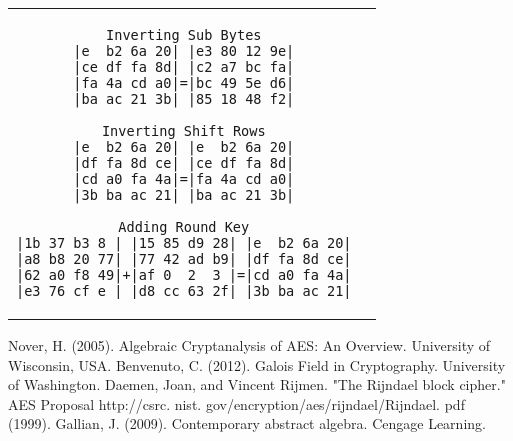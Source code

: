 \documentclass{article}
\begin{document}
\begin{tabular}{@{}c@{ }c@{}}
\begin{lstlisting}
Inverting Sub Bytes
|e  b2 6a 20| |e3 80 12 9e|
|ce df fa 8d| |c2 a7 bc fa|
|fa 4a cd a0|=|bc 49 5e d6|
|ba ac 21 3b| |85 18 48 f2|

Inverting Shift Rows
|e  b2 6a 20| |e  b2 6a 20|
|df fa 8d ce| |ce df fa 8d|
|cd a0 fa 4a|=|fa 4a cd a0|
|3b ba ac 21| |ba ac 21 3b|

Adding Round Key
|1b 37 b3 8 | |15 85 d9 28| |e  b2 6a 20|
|a8 b8 20 77| |77 42 ad b9| |df fa 8d ce|
|62 a0 f8 49|+|af 0  2  3 |=|cd a0 fa 4a|
|e3 76 cf e | |d8 cc 63 2f| |3b ba ac 21|
\end{lstlisting} \\
\end{tabular}

\pagebreak

\begin{thebibliography}{99}

 Nover, H. (2005). Algebraic Cryptanalysis of AES: An Overview. University of Wisconsin, USA.
 Benvenuto, C. (2012). Galois Field in Cryptography. University of Washington.
 Daemen, Joan, and Vincent Rijmen. "The Rijndael block cipher." AES Proposal http://csrc. nist. gov/encryption/aes/rijndael/Rijndael. pdf (1999).
 Gallian, J. (2009). Contemporary abstract algebra. Cengage Learning.
\end{thebibliography}
\end{document}
